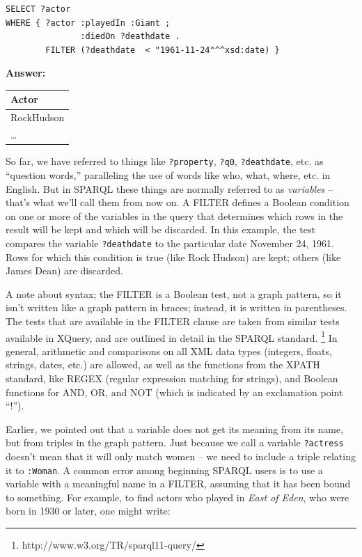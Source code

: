 
\begin{lstlisting}
SELECT ?actor
WHERE { ?actor :playedIn :Giant ;
               :diedOn ?deathdate . 
        FILTER (?deathdate  < "1961-11-24"^^xsd:date) }
\end{lstlisting}

\textbf{\textbf{Answer:}}

\begin{tabular}{|l|}
\hline
Actor\\
\hline
RockHudson\\
\ldots\\
\hline
\end{tabular}


So far, we have referred to things like \texttt{?property}, \texttt{?q0}, \texttt{?deathdate}, etc.
as ``question words,'' paralleling the use of words like who, what,
where, etc. in English. But in SPARQL these things are normally referred
to as \emph{variables} -- that's what we'll call them from now on. A
FILTER defines a Boolean condition on one or more of the variables in
the query that determines which rows in the result will be kept and
which will be discarded. In this example, the test compares the variable
\texttt{?deathdate} to the particular date November 24, 1961. Rows for which this
condition is true (like Rock Hudson) are kept; others (like James Dean)
are discarded.

A note about syntax; the FILTER is a Boolean test, not a graph pattern,
so it isn't written like a graph pattern in braces; instead, it is
written in parentheses. The tests that are available in the FILTER
clause are taken from similar tests available in XQuery, and are
outlined in detail in the SPARQL standard. \footnote{http://www.w3.org/TR/sparql11-query/} In general, arithmetic and
comparisons on all XML data types (integers, floats, strings, dates,
etc.) are allowed, as well as the functions from the XPATH standard,  like REGEX (regular
expression matching for strings), and Boolean functions for AND, OR, and
NOT (which is indicated by an exclamation point ``!'').

Earlier, we pointed out that a variable does not get its meaning from
its name, but from triples in the graph pattern. Just because we call a
variable \texttt{?actress} doesn't mean that it will only match women -- we need
to include a triple relating it to \texttt{:Woman}. A common error among
beginning SPARQL users is to use a variable with a meaningful name in a
FILTER, assuming that it has been bound to something. For example, to
find actors who played in \emph{East of Eden}, who were born in 1930 or
later, one might write:



